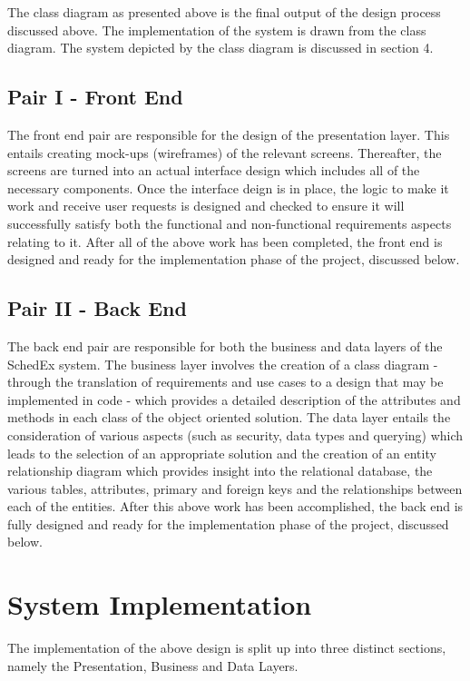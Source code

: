 \documentclass{article}
\begin{document}
The class diagram as presented above is the final output of the design process discussed above. The
implementation of the system is drawn from the class diagram. The system depicted by the class diagram
is discussed in section 4.

\subsection{Pair I - Front End}

The front end pair are responsible for the design of the presentation layer. This entails creating mock-ups (wireframes) of the relevant screens. Thereafter, the screens are turned into an actual interface design which includes all of the necessary components. Once the interface deign is in place, the logic to make it work and receive user requests is designed and checked to ensure it will successfully satisfy both the functional and non-functional requirements aspects relating to it. After all of the above work has been completed, the front end is designed and ready for the implementation phase of the project, discussed below.

\subsection{Pair II - Back End}

The back end pair are responsible for both the business and data layers of the SchedEx system. The business layer involves the creation of a class diagram - through the translation of requirements and use cases to a design that may be implemented in code - which provides a detailed description of the attributes and methods in each class of the object oriented solution. The data layer entails the consideration of various aspects (such as security, data types and querying) which leads to the selection of an appropriate solution and the creation of an entity relationship diagram which provides insight into the relational database, the various tables, attributes, primary and foreign keys and the relationships between each of the entities. After this above work has been accomplished, the back end is fully designed and ready for the implementation phase of the project, discussed below.

\section{System Implementation}
The implementation of the above design is split up into three distinct sections, namely the Presentation,
Business and Data Layers.
\end{document}
